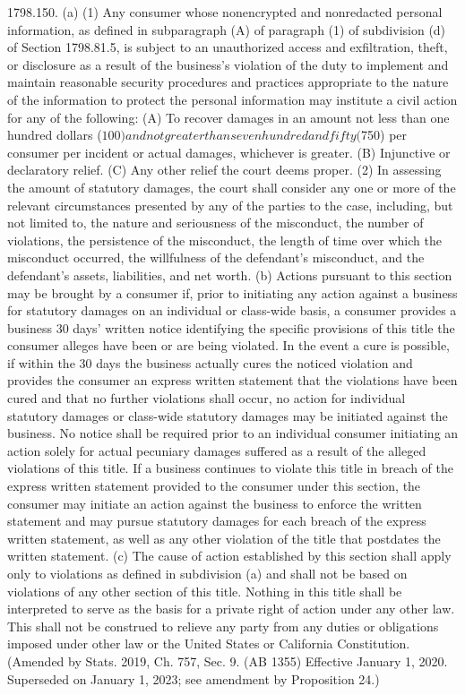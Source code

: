 1798.150.  (a) (1) Any consumer whose nonencrypted and nonredacted personal information, as defined in subparagraph (A) of paragraph (1) of subdivision (d) of Section 1798.81.5, is subject to an unauthorized access and exfiltration, theft, or disclosure as a result of the business’s violation of the duty to implement and maintain reasonable security procedures and practices appropriate to the nature of the information to protect the personal information may institute a civil action for any of the following:
(A) To recover damages in an amount not less than one hundred dollars ($100) and not greater than seven hundred and fifty ($750) per consumer per incident or actual damages, whichever is greater.
(B) Injunctive or declaratory relief.
(C) Any other relief the court deems proper.
(2) In assessing the amount of statutory damages, the court shall consider any one or more of the relevant circumstances presented by any of the parties to the case, including, but not limited to, the nature and seriousness of the misconduct, the number of violations, the persistence of the misconduct, the length of time over which the misconduct occurred, the willfulness of the defendant’s misconduct, and the defendant’s assets, liabilities, and net worth.
(b) Actions pursuant to this section may be brought by a consumer if, prior to initiating any action against a business for statutory damages on an individual or class-wide basis, a consumer provides a business 30 days’ written notice identifying the specific provisions of this title the consumer alleges have been or are being violated. In the event a cure is possible, if within the 30 days the business actually cures the noticed violation and provides the consumer an express written statement that the violations have been cured and that no further violations shall occur, no action for individual statutory damages or class-wide statutory damages may be initiated against the business. No notice shall be required prior to an individual consumer initiating an action solely for actual pecuniary damages suffered as a result of the alleged violations of this title. If a business continues to violate this title in breach of the express written statement provided to the consumer under this section, the consumer may initiate an action against the business to enforce the written statement and may pursue statutory damages for each breach of the express written statement, as well as any other violation of the title that postdates the written statement.
(c) The cause of action established by this section shall apply only to violations as defined in subdivision (a) and shall not be based on violations of any other section of this title. Nothing in this title shall be interpreted to serve as the basis for a private right of action under any other law. This shall not be construed to relieve any party from any duties or obligations imposed under other law or the United States or California Constitution.
(Amended by Stats. 2019, Ch. 757, Sec. 9. (AB 1355) Effective January 1, 2020. Superseded on January 1, 2023; see amendment by Proposition 24.)

